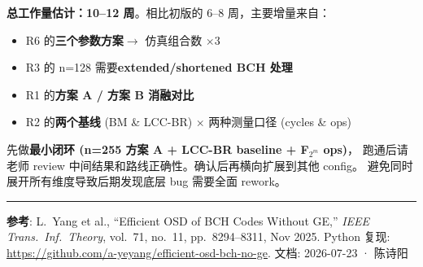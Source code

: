 \documentclass[11pt,a4paper]{article}
\begin{document}
\textbf{总工作量估计：10--12 周}。相比初版的 6--8 周，主要增量来自：

\begin{itemize}[leftmargin=1.5em, itemsep=1pt]
\item R6 的\textbf{三个参数方案}$\to$ 仿真组合数 $\times 3$
\item R3 的 n=128 需要\textbf{extended/shortened BCH 处理}
\item R1 的\textbf{方案 A / 方案 B 消融对比}
\item R2 的\textbf{两个基线} (BM \& LCC-BR) $\times$ 两种测量口径 (cycles \& ops)
\end{itemize}

\vspace{4pt}
\begin{keybox}[title=\textbf{建议的增量执行策略}]
先做\textbf{最小闭环 (n=255 方案 A + LCC-BR baseline + F$_{2^m}$ ops)}，
跑通后请老师 review 中间结果和路线正确性。确认后再横向扩展到其他 config。
避免同时展开所有维度导致后期发现底层 bug 需要全面 rework。

\vspace{4pt}
\hrule
\vspace{3pt}
{\footnotesize
\textbf{参考}: L.\ Yang et al., ``Efficient OSD of BCH Codes Without GE,''
{\it IEEE Trans.\ Inf.\ Theory}, vol.\ 71, no.\ 11, pp.\ 8294--8311, Nov 2025.
Python 复现: \url{https://github.com/a-yeyang/efficient-osd-bch-no-ge}.
文档: 2026-07-23 · 陈诗阳
}
\end{keybox}
\end{document}
